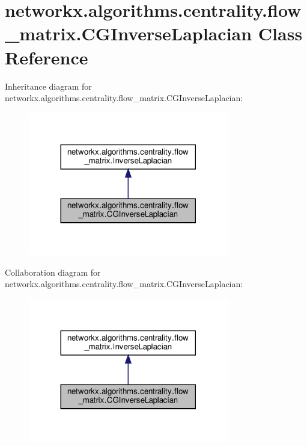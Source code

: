 \hypertarget{classnetworkx_1_1algorithms_1_1centrality_1_1flow__matrix_1_1CGInverseLaplacian}{}\section{networkx.\+algorithms.\+centrality.\+flow\+\_\+matrix.\+C\+G\+Inverse\+Laplacian Class Reference}
\label{classnetworkx_1_1algorithms_1_1centrality_1_1flow__matrix_1_1CGInverseLaplacian}


Inheritance diagram for networkx.\+algorithms.\+centrality.\+flow\+\_\+matrix.\+C\+G\+Inverse\+Laplacian\+:
\nopagebreak
\begin{figure}[H]
\begin{center}
\leavevmode
\includegraphics[width=248pt]{classnetworkx_1_1algorithms_1_1centrality_1_1flow__matrix_1_1CGInverseLaplacian__inherit__graph}
\end{center}
\end{figure}


Collaboration diagram for networkx.\+algorithms.\+centrality.\+flow\+\_\+matrix.\+C\+G\+Inverse\+Laplacian\+:
\nopagebreak
\begin{figure}[H]
\begin{center}
\leavevmode
\includegraphics[width=248pt]{classnetworkx_1_1algorithms_1_1centrality_1_1flow__matrix_1_1CGInverseLaplacian__coll__graph}
\end{center}
\end{figure}
